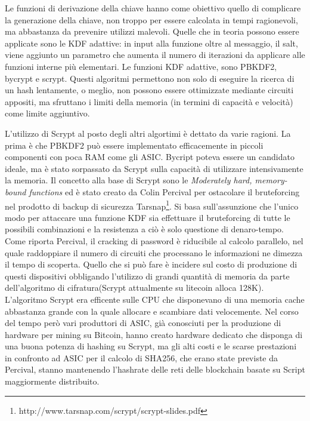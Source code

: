 	Le funzioni di derivazione della chiave hanno come obiettivo quello di complicare la generazione della chiave, non troppo per essere calcolata in tempi ragionevoli, ma abbastanza da prevenire utilizzi malevoli. Quelle che in teoria possono essere applicate sono le KDF adattive: in input alla funzione oltre al messaggio, il salt, viene aggiunto un parametro che aumenta il numero di iterazioni da applicare alle funzioni interne più elementari. Le funzioni KDF adattive, sono PBKDF2, bycrypt e scrypt. Questi algoritmi permettono non solo di eseguire la ricerca di un hash lentamente, o meglio, non possono essere ottimizzate mediante circuiti appositi, ma sfruttano i limiti della memoria (in termini di capacità e velocità) come limite aggiuntivo.
	
	L'utilizzo di Scrypt al posto degli altri algortimi è dettato da varie ragioni. La prima è che PBKDF2 può essere implementato efficacemente in piccoli componenti con poca RAM come gli ASIC. Bycript poteva essere un candidato ideale, ma è stato sorpassato da Scrypt sulla capacità di utilizzare intensivamente la memoria. 
	Il concetto alla base di Scrypt sono le \textit{Moderately hard, memory-bound functions} ed è stato creato da Colin Percival per ostacolare il bruteforcing nel prodotto di backup di sicurezza Tarsnap\footnote{http://www.tarsnap.com/scrypt/scrypt-slides.pdf}. 
	Si basa sull'assunzione che l'unico modo per attaccare una funzione KDF sia effettuare il bruteforcing di tutte le possibili combinazioni e la resistenza a ciò è solo questione di denaro-tempo. Come riporta Percival, il cracking di password è riducibile al calcolo parallelo, nel quale raddoppiare il numero di circuiti che processano le informazioni ne dimezza il tempo di scoperta. Quello che si può fare è incidere sul costo di produzione di questi dispositivi obbligando l'utilizzo di grandi quantità di memoria da parte dell'algoritmo di cifratura(Scrypt attualmente su litecoin alloca 128K). 
	L'algoritmo Scrypt era efficente sulle CPU che disponevano di una memoria cache abbastanza grande con la quale allocare e scambiare dati velocemente. Nel corso del tempo però vari produttori di ASIC, già conosciuti per la produzione di hardware per mining su Bitcoin, hanno creato hardware dedicato che disponga di una buona potenza di hashing su Scrypt, ma gli alti costi e le scarse prestazioni in confronto ad ASIC per il calcolo di SHA256, che erano state previste da Percival, stanno mantenendo l'hashrate delle reti delle blockchain basate su Script maggiormente distribuito.
	

